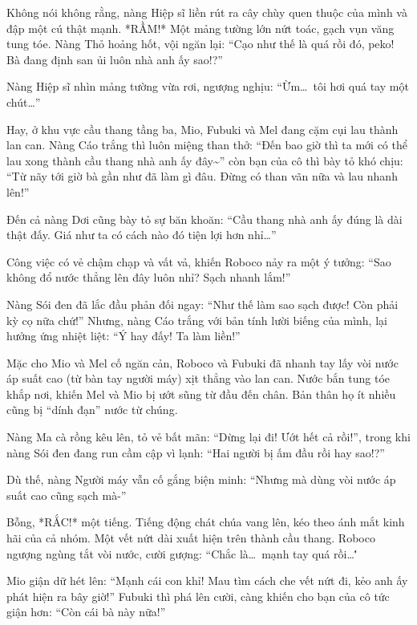 \documentclass[../main.tex]{subfiles}
\begin{document}
Không nói không rằng, nàng Hiệp sĩ liền rút ra cây chùy quen thuộc của mình và đập một cú thật mạnh. *RẦM!* Một mảng tường lớn nứt toác, gạch vụn văng tung tóe. Nàng Thỏ hoảng hốt, vội ngăn lại: ``Cạo như thế là quá rồi đó, peko! Bà đang định san ủi luôn nhà anh ấy sao!?''

Nàng Hiệp sĩ nhìn mảng tường vừa rơi, ngượng nghịu: ``Ừm\dots\ tôi hơi quá tay một chút\dots''

\ct

Hay, ở khu vực cầu thang tầng ba, Mio, Fubuki và Mel đang cặm cụi lau thành lan can. Nàng Cáo trắng thì luôn miệng than thở: ``Đến bao giờ thì ta mới có thể lau xong thành cầu thang nhà anh ấy đây\~{}'' còn bạn của cô thì bày tỏ khó chịu: ``Từ nãy tới giờ bà gần như đã làm gì đâu. Đừng có than vãn nữa và lau nhanh lên!''

Đến cả nàng Dơi cũng bày tỏ sự băn khoăn: ``Cầu thang nhà anh ấy đúng là dài thật đấy. Giá như ta có cách nào đó tiện lợi hơn nhỉ\dots''

Công việc có vẻ chậm chạp và vất vả, khiến Roboco nảy ra một ý tưởng: ``Sao không đổ nước thẳng lên đây luôn nhỉ? Sạch nhanh lắm!''

Nàng Sói đen đã lắc đầu phản đối ngay: ``Như thế làm sao sạch được! Còn phải kỳ cọ nữa chứ!'' Nhưng, nàng Cáo trắng với bản tính lười biếng của mình, lại hưởng ứng nhiệt liệt: ``Ý hay đấy! Ta làm liền!''

Mặc cho Mio và Mel cố ngăn cản, Roboco và Fubuki đã nhanh tay lấy vòi nước áp suất cao (từ bàn tay người máy) xịt thẳng vào lan can. Nước bắn tung tóe khắp nơi, khiến Mel và Mio bị ướt sũng từ đầu đến chân. Bản thân họ ít nhiều cũng bị ``dính đạn'' nước từ chúng.

Nàng Ma cà rồng kêu lên, tỏ vẻ bất mãn: ``Dừng lại đi! Ướt hết cả rồi!'', trong khi nàng Sói đen đang run cầm cập vì lạnh: ``Hai người bị ấm đầu rồi hay sao!?''

Dù thế, nàng Người máy vẫn cố gắng biện minh: ``Nhưng mà dùng vòi nước áp suất cao cũng sạch mà-''

Bỗng, *RẮC!* một tiếng. Tiếng động chát chúa vang lên, kéo theo ánh mắt kinh hãi của cả nhóm. Một vết nứt dài xuất hiện trên thành cầu thang. Roboco ngượng ngùng tắt vòi nước, cười gượng: ``Chắc là\dots\ mạnh tay quá rồi\dots\''

Mio giận dữ hét lên: ``Mạnh cái con khỉ! Mau tìm cách che vết nứt đi, kẻo anh ấy phát hiện ra bây giờ!'' Fubuki thì phá lên cười, càng khiến cho bạn của cô tức giận hơn: ``Còn cái bà này nữa!''
\end{document}
